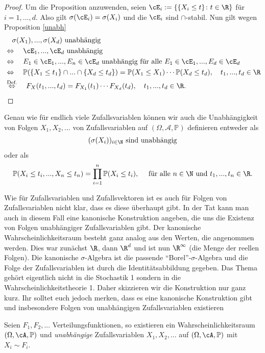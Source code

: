 \begin{proof}
Um die Proposition anzuwenden, seien $\cE_i := \{ \{X_i \leq t \}\colon t \in \R \}$ f\"ur $i=1,...,d$. Also gilt $\sigma(\cE_i) = \sigma(X_i)$ und die $\cE_i$ sind $\cap$-stabil. Nun gilt wegen Proposition \ref{unabh}
\begin{align*}
	&\quad \sigma(X_1),...,\sigma(X_d) \text{ unabhängig }\\
	&\Leftrightarrow\quad \cE_1,...,\cE_d \text{ unabhängig}\\
	&\Leftrightarrow\quad E_1 \in \cE_1, ..., E_n\in \cE_d\text{ unabh\"angig f\"ur alle } E_1\in \cE_1, ..., E_d\in \cE_d\\
	&\Leftrightarrow\quad \mathbb{P}(\{ X_1 \leq t_1 \} \cap ... \cap \{ X_d \leq t_d \})=\mathbb P(X_1\leq X_1)\cdots \mathbb P(X_d\leq t_d),\quad t_1,..., t_d\in \R\\
	&\overset{\text{Def.}}{\Leftrightarrow} \quad F_X(t_1,..., t_d)=F_{X_1}(t_1)\cdots F_{X_d}(t_d),\quad t_1,..., t_d\in \R.
\end{align*}	
\end{proof}
\begin{bem}
	Genau wie f\"ur endlich viele Zufallsvariablen k\"onnen wir auch die Unabh\"angigkeit von Folgen $X_1, X_2, ...$ von Zufallsvariablen auf $(\Omega, \mathcal A, \mathbb P)$ definieren entweder als 
	\begin{align*}
		(\sigma(X_i))_{i\in \N} \text{ sind unabh\"angig}
	\end{align*}
	oder als 
	\begin{align*}
		\mathbb P(X_i \leq t_i, ..., X_n\leq t_n)=\prod_{i=1}^n \mathbb P(X_i \leq t_i),\quad \text{ f\"ur alle } n\in\N \text{ und } t_1, ..., t_n\in\R.
	\end{align*}
\end{bem}
Wie f\"ur Zufallsvariablen und Zufallsvektoren ist es auch f\"ur Folgen von Zufallsvariablen nicht klar, dass es diese \"uberhaupt gibt. In der Tat kann man auch in diesem Fall eine kanonische Konstruktion angeben, die uns die Existenz von Folgen unabh\"angiger Zufallsvariablen gibt. Der kanonische Wahrscheinlichkeitsraum besteht ganz analog aus den Werten, die angenommen werden. Dies war zun\"achst $\R$, dann $\R^d$ und ist nun $\R^\infty$ (die Menge der reellen Folgen). Die kanonische $\sigma$-Algebra ist die passende \enquote{Borel}-$\sigma$-Algebra und die Folge der Zufallsvariablen ist durch die Identit\"atsabbildung gegeben. Das Thema geh\"ort eigentlich nicht in die Stochastik 1 sondern in die Wahrscheinlichkeitstheorie 1. Daher skizzieren wir die Konstruktion nur ganz kurz. Ihr solltet euch jedoch merken, dass es eine kanonische Konstruktion gibt und insbesondere Folgen von unabh\"angigen Zufallsvariablen existieren
\begin{satz}
	Seien $F_1,F_2,...$ Verteilungsfunktionen, so existieren ein Wahrscheinlichkeitsraum $(\Omega, \cA, \mathbb{P})$ und \textit{unabhängige} Zufallsvariablen $X_1,X_2,...$ auf $(\Omega, \cA, \mathbb{P})$ mit $X_i \sim F_i$.
\end{satz}


